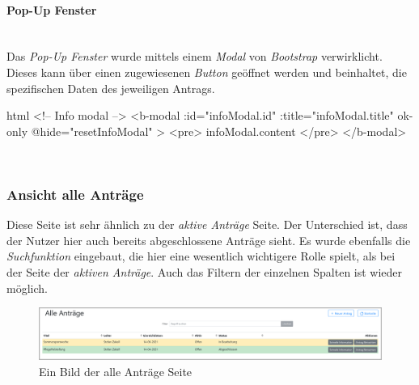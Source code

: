 \paragraph{Pop-Up Fenster}
~\\
Das \textit{Pop-Up Fenster} wurde mittels einem \textit{Modal} von \textit{Bootstrap} verwirklicht. Dieses kann über einen zugewiesenen \textit{Button} geöffnet werden und beinhaltet, die spezifischen Daten des jeweiligen Antrags.
\begin{code}{html}
	<!-- Info modal -->
    <b-modal
      :id="infoModal.id"
      :title="infoModal.title"
      ok-only
      @hide="resetInfoModal"
    >
      <pre>{{ infoModal.content }}</pre>
    </b-modal>
\end{code}
	\label{list:codepopup} ~\\

\subsubsection{Ansicht alle Anträge}
\label{chapter:implementierung-frontend-komponenten-alle}
Diese Seite ist sehr ähnlich zu der \textit{aktive Anträge} Seite. Der Unterschied ist, dass der Nutzer hier auch bereits abgeschlossene Anträge sieht. Es wurde ebenfalls die \textit{Suchfunktion} eingebaut, die hier eine wesentlich wichtigere Rolle spielt, als bei der Seite der \textit{aktiven Anträge}. Auch das Filtern der einzelnen Spalten ist wieder möglich.
\begin{figure}[H]
	\centering
	\includegraphics[width=1\linewidth]{images/ldehner_implementierung/alle}
	\caption[Alle Anträge Seite]{Ein Bild der alle Anträge Seite}
	\label{fig:antragalle}
\end{figure}

